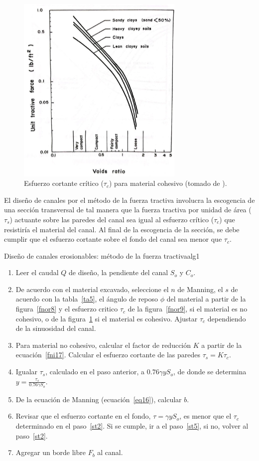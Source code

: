 \documentclass[11pt, oneside]{article}
\begin{document}
\begin{figure}[h!]
\centering
\includegraphics[width=8cm]{fig95.jpeg}
\caption{Esfuerzo cortante cr\'itico ($\tau_c$) para material cohesivo (tomado de \cite{Chau}).}
\label{fnor10}
\end{figure}

El diseño de canales por el m\'etodo de la fuerza tractiva involucra la escogencia de una secci\'on transversal de tal manera que la fuerza tractiva por unidad de \'area ($\tau_s$) actuante sobre las paredes del canal sea igual al esfuerzo cr\'itico ($\tau_c$) que resistiría el material del canal. Al final de la escogencia de la secci\'on, se debe cumplir que el esfuerzo cortante sobre el fondo del canal sea menor que $\tau_c$.

\begin{alg}{Diseño de canales erosionables: m\'etodo de la fuerza tractiva}{alg1}
\begin{enumerate}
\item Leer el caudal $Q$ de diseño, la pendiente del canal $S_o$ y $C_o$.
\item \label{st2} De acuerdo con el material excavado, seleccione el $n$ de Manning, el $s$ de acuerdo con la tabla~\ref{ta5}, el \'angulo de reposo $\phi$ del material a partir de la figura~\ref{fnor8} y el esfuerzo critico $\tau_c$ de la figura~\ref{fnor9}, si el material es no cohesivo, o de la figura~\ref{fnor10} si el material es cohesivo. Ajustar $\tau_c$ dependiendo de la sinuosidad del canal. 
\item Para material no cohesivo, calcular el factor de reducci\'on $K$ a partir de la ecuaci\'on~\ref{fni17}. Calcular el esfuerzo cortante de las paredes $\tau_s = K \tau_c$.
\item Igualar $\tau_s$, calculado en el paso anterior, a $0.76\gamma y S_o$, de donde se determina $y=\frac{\tau_s}{0.76 \gamma S_o}$. 
\item De la ecuaci\'on de Manning (ecuaci\'on~\ref{eq16}), calcular $b$.
\item Revisar que el esfuerzo cortante en el fondo, $\tau = \gamma y S_o$, es menor que el $\tau_c$ determinado en el paso~\ref{st2}. Si se cumple, ir a el paso~\ref{st5}, si no, volver al paso~\ref{st2}. 
\item \label{st5} Agregar un borde libre $F_b$ al canal.
\end{enumerate}
\end{alg}
\end{document}
